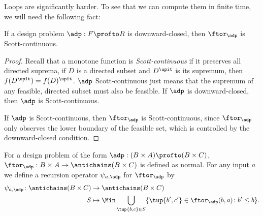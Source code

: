 Loops are significantly harder. To see that we can compute them in finite time, we will need the following fact:
\begin{lemma}
    If a design problem $\adp : F \profto R$ is downward-closed, then $\ftor_\adp$ is Scott-continuous.
\end{lemma}

\begin{proof}
    Recall that a monotone function is \emph{Scott-continuous} if it preserves all directed suprema, \ie  if $D$ is a directed subset and $D^\upit$ is its supremum, then $f(D^\upit) = f(D)^\upit$. $\adp$ Scott-continuous just means that the supremum of any feasible, directed subset must also be feasible. If $\adp$ is downward-closed, then $\adp$ is Scott-continuous.

     

    If $\adp$ is Scott-continuous, then $\ftor_\adp$ is Scott-continuous, since $\ftor_\adp$ only observes the lower boundary of the feasible set, which is controlled by the downward-closed condition.
\end{proof}

For a design problem of the form $\adp : (B \times A) \profto (B \times C)$, $\ftor_\adp : B \times A \to \antichains (B \times C)$ is defined as normal. For any input $a$ we define a recursion operator $\psi_{a,\adp}$ for $\ftor_\adp$ by
\begin{equation}
    \begin{aligned}
        \psi_{a,\adp} \colon \antichains (B \times C) &\to \antichains (B \times C) \\
        S &\mapsto \Min \bigcup_{\tup{b,c} \in S} \{ \tup{b',c'} \in \ftor_\adp(b,a) \colon b' \leq b \}.
    \end{aligned}
\end{equation}


